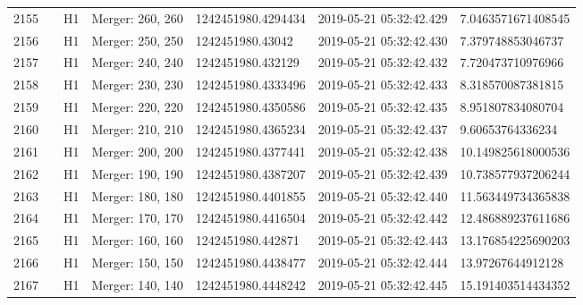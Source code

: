 \begin{longtable}{lllllll}
2155 &                                                    &       H1 &  Merger: 260, 260 &  1242451980.4294434 &  2019-05-21 05:32:42.429 &  7.0463571671408545 \\
2156 &                                                    &       H1 &  Merger: 250, 250 &    1242451980.43042 &  2019-05-21 05:32:42.430 &   7.379748853046737 \\
2157 &                                                    &       H1 &  Merger: 240, 240 &   1242451980.432129 &  2019-05-21 05:32:42.432 &   7.720473710976966 \\
2158 &                                                    &       H1 &  Merger: 230, 230 &  1242451980.4333496 &  2019-05-21 05:32:42.433 &   8.318570087381815 \\
2159 &                                                    &       H1 &  Merger: 220, 220 &  1242451980.4350586 &  2019-05-21 05:32:42.435 &   8.951807834080704 \\
2160 &                                                    &       H1 &  Merger: 210, 210 &  1242451980.4365234 &  2019-05-21 05:32:42.437 &    9.60653764336234 \\
2161 &                                                    &       H1 &  Merger: 200, 200 &  1242451980.4377441 &  2019-05-21 05:32:42.438 &  10.149825618000536 \\
2162 &                                                    &       H1 &  Merger: 190, 190 &  1242451980.4387207 &  2019-05-21 05:32:42.439 &  10.738577937206244 \\
2163 &                                                    &       H1 &  Merger: 180, 180 &  1242451980.4401855 &  2019-05-21 05:32:42.440 &  11.563449734365838 \\
2164 &                                                    &       H1 &  Merger: 170, 170 &  1242451980.4416504 &  2019-05-21 05:32:42.442 &  12.486889237611686 \\
2165 &                                                    &       H1 &  Merger: 160, 160 &   1242451980.442871 &  2019-05-21 05:32:42.443 &  13.176854225690203 \\
2166 &                                                    &       H1 &  Merger: 150, 150 &  1242451980.4438477 &  2019-05-21 05:32:42.444 &   13.97267644912128 \\
2167 &                                                    &       H1 &  Merger: 140, 140 &  1242451980.4448242 &  2019-05-21 05:32:42.445 &  15.191403514434352 \\

\end{longtable}
